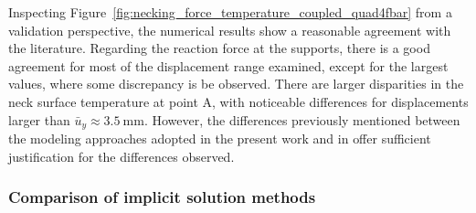      Inspecting Figure~\ref{fig:necking_force_temperature_coupled_quad4fbar} from a validation perspective, the numerical results show a reasonable agreement with the literature.
     Regarding the reaction force at the supports, there is a good agreement for most of the displacement range examined, except for the largest values, where some discrepancy is be observed.
     There are larger disparities in the neck surface temperature at point A, with noticeable differences for displacements larger than \(\bar{u}_y\approx\SI{3.5}{\milli\meter}\).
     However, the differences previously mentioned between the modeling approaches adopted in the present work and in \cite{simo_associative_1992} offer sufficient justification for the differences observed.

     \subsubsection{Comparison of implicit solution methods}

